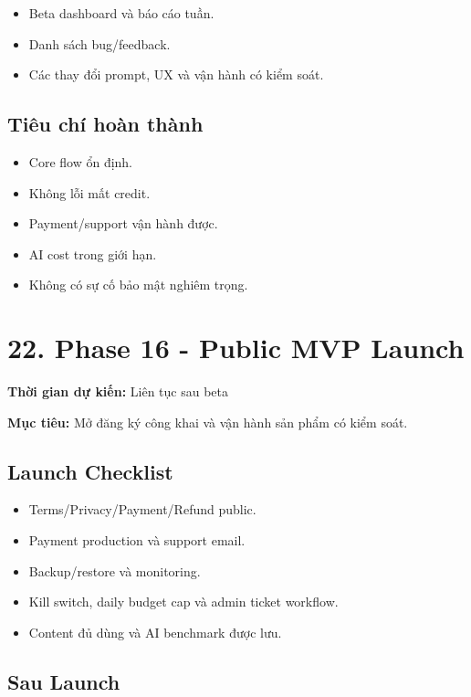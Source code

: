 \documentclass[
  11pt,
  a4paper,
]{article}
\begin{document}
\begin{itemize}
\item
  Beta dashboard và báo cáo tuần.
\item
  Danh sách bug/feedback.
\item
  Các thay đổi prompt, UX và vận hành có kiểm soát.
\end{itemize}

\subsection{Tiêu chí hoàn
thành}\label{tiuxeau-chuxed-houxe0n-thuxe0nh-15}

\begin{itemize}
\item
  Core flow ổn định.
\item
  Không lỗi mất credit.
\item
  Payment/support vận hành được.
\item
  AI cost trong giới hạn.
\item
  Không có sự cố bảo mật nghiêm trọng.
\end{itemize}

\section{22. Phase 16 - Public MVP
Launch}\label{phase-16---public-mvp-launch}

\textbf{Thời gian dự kiến:} Liên tục sau beta

\textbf{Mục tiêu:} Mở đăng ký công khai và vận hành sản phẩm có kiểm
soát.

\subsection{Launch Checklist}\label{launch-checklist}

\begin{itemize}
\item
  Terms/Privacy/Payment/Refund public.
\item
  Payment production và support email.
\item
  Backup/restore và monitoring.
\item
  Kill switch, daily budget cap và admin ticket workflow.
\item
  Content đủ dùng và AI benchmark được lưu.
\end{itemize}

\subsection{Sau Launch}\label{sau-launch}
\end{document}
